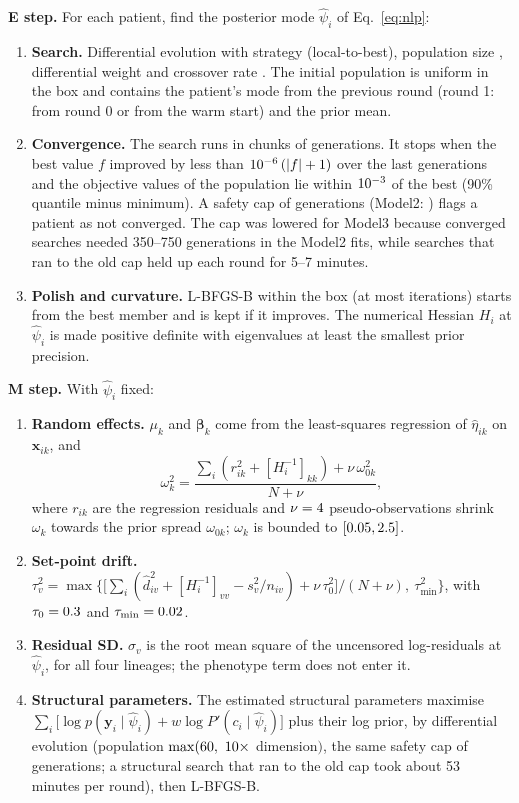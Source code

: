 \documentclass[11pt]{article}
\begin{document}
\textbf{E step.} For each patient, find the posterior mode $\hat\psi_i$ of Eq.~\ref{eq:nlp}:
\begin{enumerate}
\item \textbf{Search.} Differential evolution with strategy \valDeStrategy{} (local-to-best), population size \valDeNp, differential weight \valDeF{} and crossover rate \valDeCR. The initial population is uniform in the box and contains the patient's mode from the previous round (round 1: from round 0 or from the warm start) and the prior mean.
\item \textbf{Convergence.} The search runs in chunks of \valDeChunk{} generations. It stops when the best value $f$ improved by less than $10^{-6}\,(|f|+1)$ over the last \valDeWindow{} generations and the objective values of the population lie within $10^{-3}$ of the best (90\% quantile minus minimum). A safety cap of \valDeMaxGen{} generations (Model2: \valMaxGenModelTwo) flags a patient as not converged. The cap was lowered for Model3 because converged searches needed 350--750 generations in the Model2 fits, while searches that ran to the old cap held up each round for 5--7 minutes.
\item \textbf{Polish and curvature.} L-BFGS-B within the box (at most \valDePolish{} iterations) starts from the best member and is kept if it improves. The numerical Hessian $H_i$ at $\hat\psi_i$ is made positive definite with eigenvalues at least the smallest prior precision.
\end{enumerate}

\textbf{M step.} With $\hat\psi_i$ fixed:
\begin{enumerate}
\item \textbf{Random effects.} $\mu_k$ and $\boldsymbol\beta_k$ come from the least-squares regression of $\hat\eta_{ik}$ on $\mathbf x_{ik}$, and
\[
\omega_k^2=\frac{\sum_i(r_{ik}^2+[H_i^{-1}]_{kk})+\nu\,\omega_{0k}^2}{N+\nu},
\]
where $r_{ik}$ are the regression residuals and $\nu=4$ pseudo-observations shrink $\omega_k$ towards the prior spread $\omega_{0k}$; $\omega_k$ is bounded to $[0.05,2.5]$.
\item \textbf{Set-point drift.} $\tau_v^2=\max\bigl\{\bigl[\sum_i(\hat d_{iv}^2+[H_i^{-1}]_{vv}-s_v^2/n_{iv})+\nu\,\tau_0^2\bigr]/(N+\nu),\ \tau_{\min}^2\bigr\}$, with $\tau_0=0.3$ and $\tau_{\min}=0.02$.
\item \textbf{Residual SD.} $\sigma_v$ is the root mean square of the uncensored log-residuals at $\hat\psi_i$, for all four lineages; the phenotype term does not enter it.
\item \textbf{Structural parameters.} The estimated structural parameters maximise $\sum_i\bigl[\log p(\mathbf y_i\mid\hat\psi_i)+w\log P'(c_i\mid\hat\psi_i)\bigr]$ plus their log prior, by differential evolution (population $\max(\valDeStructNpMin,\ \valDeStructNpDim\times$ dimension$)$, the same safety cap of \valDeMaxGen{} generations; a structural search that ran to the old cap took about 53 minutes per round), then L-BFGS-B.
\end{enumerate}
\end{document}
